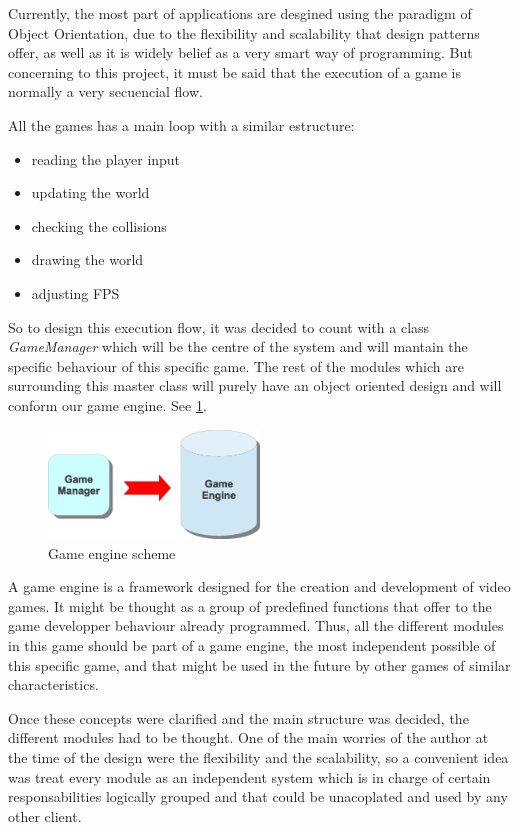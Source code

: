 \documentclass[]{article}
\begin{document}
Currently, the most part of applications are desgined using the paradigm of Object Orientation, due to the flexibility and scalability that design patterns offer, as well as it is widely belief
as a very smart way of programming. But concerning to this project, it must be said that the execution of a game is normally a very secuencial flow.

All the games has a main loop with a similar estructure:
\begin{itemize}
 \item reading the player input
 \item updating the world
 \item checking the collisions
 \item drawing the world
 \item adjusting FPS
\end{itemize}

So to design this execution flow, it was decided to count with a class \emph{GameManager} which will be the centre of the system and will mantain the specific behaviour of this specific game. 
The rest of the modules which are surrounding this master class will purely have an object oriented design and will conform our game engine. See \ref{fig:ge}.

\begin{figure}[h]
\begin{center}
\includegraphics[width=0.5\textwidth]{images/gameEngine.eps}
\caption{Game engine scheme}
\label{fig:ge}
\end{center}
\end{figure}

A game engine is a framework designed for the creation and development of video games. It might be thought as a group of predefined functions that offer to the game developper behaviour
already programmed. Thus, all the different modules in this game should be part of a game engine, the most independent possible of this specific game, and that might be used in the future by
other games of similar characteristics.

Once these concepts were clarified and the main structure was decided, the different modules had to be thought. One of the main worries of the author at the time of the design were the flexibility
and the scalability, so a convenient idea was treat every module as an independent system which is in charge of certain responsabilities logically grouped and that could be unacoplated and used by any
other client. 
\end{document}
